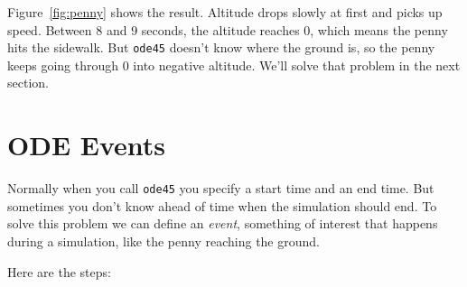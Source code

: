 Figure~\ref{fig:penny} shows the result.  Altitude drops slowly at first and picks up speed.  Between 8 and 9 seconds, the altitude reaches 0, which means the penny hits the sidewalk.  But \lstinline{ode45} doesn't know where the ground is, so  the penny keeps going through 0 into negative altitude.  We'll solve that problem in the next section.

\section{ODE Events}
\label{events}


Normally when you call \lstinline{ode45} you specify a start time and
an end time.  But sometimes you don't know ahead of time when the
simulation should end.  To solve this problem we can define an \emph{event}, 
something of interest that happens during a simulation,
like the penny reaching the ground.

Here are the steps: 


